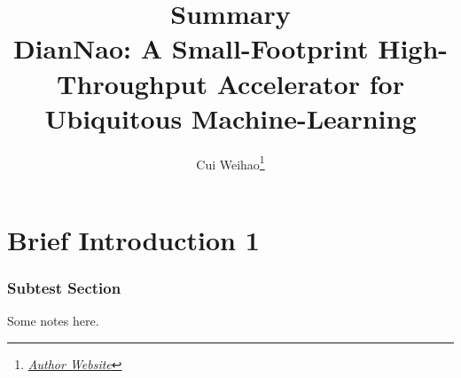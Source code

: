 \documentclass[10pt]{article}
\title{{\Huge Summary}\\{\Large{DianNao: A Small-Footprint High-Throughput Accelerator for Ubiquitous Machine-Learning}}}
\author{Cui Weihao\footnote{\href{https://google.com/}{\textit{Author Website}}}}
\affiliation{SJTU}
\begin{document}
    \maketitle
    \flushbottom
    \newpage
    \pagestyle{fancynotes}
    \part{Brief Introduction 1}
    
    \section{Subtest Section}
    Some notes here.
\end{document}
